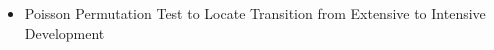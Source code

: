 \begin{itemize}
\tightlist
\item
  Poisson Permutation Test to Locate Transition from Extensive to
  Intensive Development
\end{itemize}
